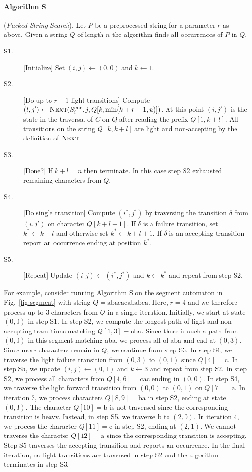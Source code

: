 \documentclass{article}
\newcommand{\enc}{\ensuremath{\mathrm{enc}}}
\newcommand{\Next}{\ensuremath{\textsc{Next}}}
\begin{document}
\paragraph{\bf Algorithm S}(\emph{Packed String Search}). Let $P$ be a
preprocessed string for a parameter $r$ as above. Given a string $Q$
of length $n$ the algorithm finds all occurrences of $P$ in $Q$.
\begin{description}
\item[S1.] [Initialize] Set $(i,j) \leftarrow (0,0)$ and $k \leftarrow
  1$.
\item[S2.] [Do up to $r-1$ light transitions] Compute $(l, j') \leftarrow
  \Next(S_i^{\enc}, j, Q[k, \min(k+r-1, n)])$. At this point $(i,j')$ is
  the state in the traversal of $C$ on $Q$ after reading the prefix
  $Q[1, k+l]$. All transitions on the string $Q[k, k+l]$ are light and
  non-accepting by the definition of $\Next$.
\item[S3.] [Done?] If $k + l= n$ then terminate. In this case step S2
  exhausted remaining characters from $Q$.
\item[S4.] [Do single transition] Compute $(i^*, j^*)$ by traversing the
  transition $\delta$ from $(i,j')$ on character $Q[k+l+1]$. If
  $\delta$ is a failure transition, set $k^* \leftarrow k + l$ and
  otherwise set $k^* \leftarrow k + l + 1$. If $\delta$ is an
  accepting transition report an occurrence ending at position $k^*$.
\item[S5.] [Repeat] Update $(i,j) \leftarrow (i^*,j^*)$ and $k
  \leftarrow k^*$ and repeat from step S2.
\end{description}
For example, consider running Algorithm S on the segment automaton in
Fig.~\ref{fig:segment} with string $Q = \text{abacacababca}$. Here, $r
= 4$ and we therefore process up to $3$ characters from $Q$ in a
single iteration. Initially, we start at state $(0,0)$ in step S1. In
step S2, we compute the longest path of light and non-accepting
transitions matching $Q[1,3] = \text{aba}$. Since there is such a path
from $(0,0)$ in this segment matching aba, we process all of aba and
end at $(0,3)$. Since more characters remain in $Q$, we continue from
step S3. In step S4, we traverse the light failure transition from
$(0,3)$ to $(0,1)$ since $Q[4] = \text{c}$. In step S5, we update
$(i,j) \leftarrow (0,1)$ and $k \leftarrow 3$ and repeat from step
S2. In step S2, we process all characters from $Q[4,6] = \text{cac}$
ending in $(0,0)$. In step S4, we traverse the light forward
transition from $(0,0)$ to $(0,1)$ on $Q[7] = \text{a}$. In iteration
3, we process characters $Q[8,9] = \text{ba}$ in step S2, ending at state
$(0,3)$. The character $Q[10] = \text{b}$ is not traversed since the
corresponding transition is heavy. Instead, in step S5, we traverse b
to $(2,0)$. In iteration 4, we process the character $Q[11] = \text{c}$ in
step S2, ending at $(2,1)$. We cannot traverse the character $Q[12] =
\text{a}$ since the corresponding transition is accepting. Step S5 traverses
the accepting transition and reports an occurrence. In the final
iteration, no light transitions are traversed in step S2 and the
algorithm terminates in step S3.
\end{document}

